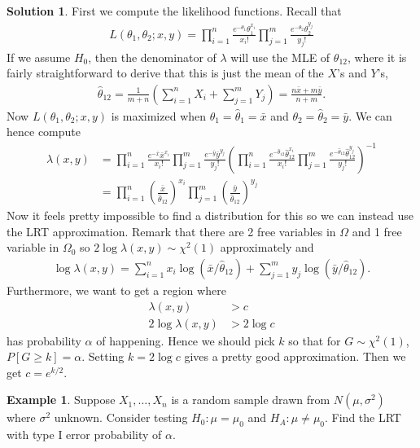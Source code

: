 \documentclass[11pt]{amsart}
\theoremstyle{definition}
\newtheorem{example}[theorem]{Example}
\newtheorem{solution}[theorem]{Solution}
\numberwithin{equation}{section}
\begin{document}
\begin{solution}
    First we compute the likelihood functions. Recall that 
    \begin{align*}
        L(\theta_1,\theta_2;x,y)=\prod_{i=1}^n\frac{e^{-\theta_1}\theta_1^{x_i}}{x_i!}\prod_{j=1}^m\frac{e^{-\theta_2}\theta_2^{y_j}}{y_j!}
    \end{align*}
    If we assume $H_0$, then the denominator of $\lambda$ will use the MLE of $\theta_{12}$, where it is fairly straightforward to derive that this is just the mean of the $X$'s and $Y$'s, 
    \begin{align*}
        \hat\theta_{12}=\frac{1}{m+n}(\sum_{i=1}^nX_i+\sum_{j=1}^mY_j)=\frac{n\bar x+m\bar y}{n+m}.
    \end{align*}
    Now $L(\theta_1,\theta_2;x,y)$ is maximized when $\theta_1=\hat\theta_1=\bar x$ and $\theta_2=\hat\theta_2=\bar y$. We can hence compute
    \begin{align*}
        \lambda(x,y)&=\prod_{i=1}^n\frac{e^{-\bar x}\bar x^{x_i}}{x_i!}\prod_{j=1}^m\frac{e^{-\bar y}\bar y^{y_j}}{y_j!}\left(\prod_{i=1}^n\frac{e^{-\hat\theta_{12}}\hat\theta_{12}^{x_i}}{x_i!}\prod_{j=1}^m\frac{e^{-\hat\theta_{12}}\hat\theta_{12}^{y_j}}{y_j!}\right)^{-1}\\
        &=\prod_{i=1}^n\left(\frac{\bar x}{\hat\theta_{12}}\right)^{x_i}\prod_{j=1}^m\left(\frac{\bar y}{\hat\theta_{12}}\right)^{y_j}
    \end{align*}
    Now it feels pretty impossible to find a distribution for this so we can instead use the LRT approximation. Remark that there are 2 free variables in $\Omega$ and 1 free variable in $\Omega_0$ so $2\log\lambda(x,y)\sim \chi^2(1)$ approximately and
    \begin{align*}
        \log \lambda(x,y)=\sum_{i=1}^n x_i\log(\bar x/\hat\theta_{12})+\sum_{j=1}^my_j\log(\bar y/\hat\theta_{12}).
    \end{align*}
    Furthermore, we want to get a region where
    \begin{align*}
        \lambda(x,y)&>c\\
        2\log\lambda(x,y)&>2\log c
    \end{align*}
    has probability $\alpha$ of happening. Hence we should pick $k$ so that for $G\sim\chi^2(1)$, $P[G\ge k]=\alpha$. Setting $k=2\log c$ gives a pretty good approximation. Then we get $c=e^{k/2}$.
\end{solution}
\begin{example}
    Suppose $X_1,\ldots,X_n$ is a random sample drawn from $N(\mu,\sigma^2)$ where $\sigma^2$ unknown. Consider testing $H_0:\mu=\mu_0$ and $H_A:\mu\ne\mu_0$. Find the LRT with type I error probability of $\alpha$.
\end{example}
\end{document}

